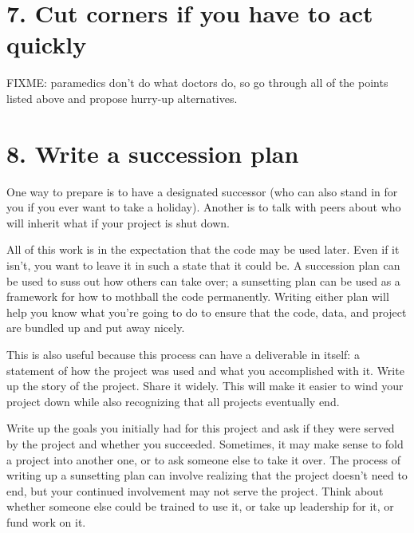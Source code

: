 \documentclass[10pt,letterpaper]{article}
\begin{document}
\section*{7. Cut corners if you have to act quickly}

FIXME: paramedics don't do what doctors do,
so go through all of the points listed above and propose hurry-up alternatives.

\section*{8. Write a succession plan}

  One way to prepare is to have a designated successor
  (who can also stand in for you if you ever want to take a holiday).
  Another is to talk with peers about who will inherit what if your project is shut down.

All of this work is in the expectation that the code may be used later.
Even if it isn't,
you want to leave it in such a state that it could be.
A succession plan can be used to suss out how others can take over;
a sunsetting plan can be used as a framework for how to mothball the code permanently.
Writing either plan will help you know what you're going to do to ensure that the code,
data,
and project are bundled up and put away nicely.

This is also useful because this process can have a deliverable in itself:
a statement of how the project was used and what you accomplished with it.
Write up the story of the project.
Share it widely.
This will make it easier to wind your project down
while also recognizing that all projects eventually end.

Write up the goals you initially had for this project
and ask if they were served by the project and whether you succeeded.
Sometimes,
it may make sense to fold a project into another one,
or to ask someone else to take it over.
The process of writing up a sunsetting plan can involve realizing that
the project doesn't need to end,
but your continued involvement may not serve the project.
Think about whether someone else could be trained to use it,
or take up leadership for it,
or fund work on it.
\end{document}
